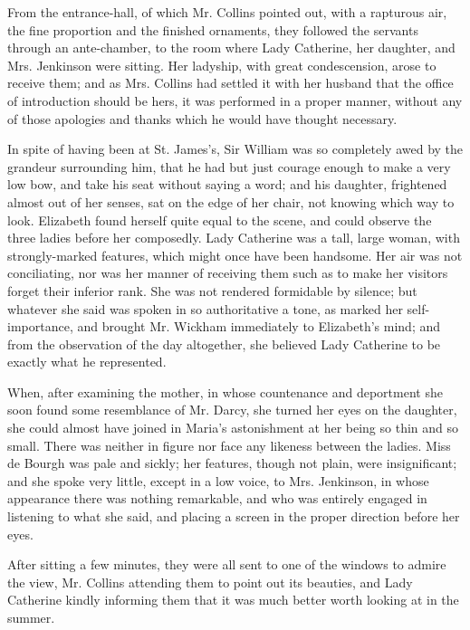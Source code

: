 From the entrance-hall, of which Mr. Collins pointed out, with a rapturous air, the fine proportion and the finished ornaments, they followed the servants through an ante-chamber, to the room where Lady Catherine, her daughter, and Mrs. Jenkinson were sitting. Her ladyship, with great condescension, arose to receive them; and as Mrs. Collins had settled it with her husband that the office of introduction should be hers, it was performed in a proper manner, without any of those apologies and thanks which he would have thought necessary.

In spite of having been at St. James's, Sir William was so completely awed by the grandeur surrounding him, that he had but just courage enough to make a very low bow, and take his seat without saying a word; and his daughter, frightened almost out of her senses, sat on the edge of her chair, not knowing which way to look. Elizabeth found herself quite equal to the scene, and could observe the three ladies before her composedly. Lady Catherine was a tall, large woman, with strongly-marked features, which might once have been handsome. Her air was not conciliating, nor was her manner of receiving them such as to make her visitors forget their inferior rank. She was not rendered formidable by silence; but whatever she said was spoken in so authoritative a tone, as marked her self-importance, and brought Mr. Wickham immediately to Elizabeth's mind; and from the observation of the day altogether, she believed Lady Catherine to be exactly what he represented.

When, after examining the mother, in whose countenance and deportment she soon found some resemblance of Mr. Darcy, she turned her eyes on the daughter, she could almost have joined in Maria's astonishment at her being so thin and so small. There was neither in figure nor face any likeness between the ladies. Miss de Bourgh was pale and sickly; her features, though not plain, were insignificant; and she spoke very little, except in a low voice, to Mrs. Jenkinson, in whose appearance there was nothing remarkable, and who was entirely engaged in listening to what she said, and placing a screen in the proper direction before her eyes.

After sitting a few minutes, they were all sent to one of the windows to admire the view, Mr. Collins attending them to point out its beauties, and Lady Catherine kindly informing them that it was much better worth looking at in the summer.


